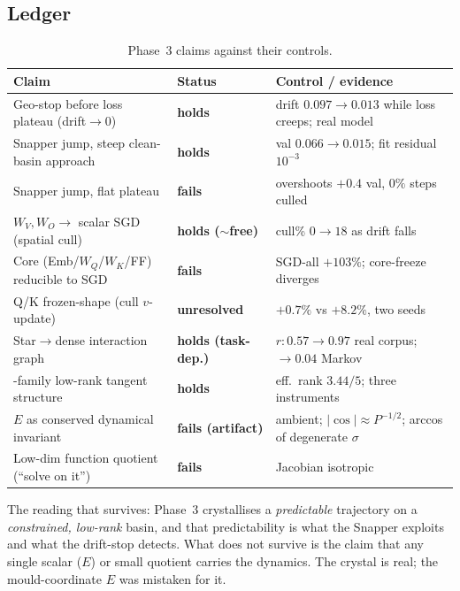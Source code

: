 \subsection{Ledger}
\begin{table}[H]
\centering
\caption{Phase~3 claims against their controls.}
\label{tab:phase3ledger}
\begin{tabular}{p{} p{} p{}}
\toprule
\textbf{Claim} & \textbf{Status} & \textbf{Control / evidence} \\
\midrule
Geo-stop before loss plateau (drift$\to$0) & \textbf{holds} & drift $0.097\!\to\!0.013$ while loss creeps; real model \\
\addlinespace
Snapper jump, steep clean-basin approach & \textbf{holds} & val $0.066\!\to\!0.015$; fit residual $10^{-3}$ \\
\addlinespace
Snapper jump, flat plateau & \textbf{fails} & overshoots $+0.4$ val, $0\%$ steps culled \\
\addlinespace
$W_V,W_O\to$ scalar SGD (spatial cull) & \textbf{holds ($\sim$free)} & cull\% $0\!\to\!18$ as drift falls \\
\addlinespace
Core (Emb/$W_Q$/$W_K$/FF) reducible to SGD & \textbf{fails} & SGD-all $+103\%$; core-freeze diverges \\
\addlinespace
Q/K frozen-shape (cull $v$-update) & \textbf{unresolved} & $+0.7\%$ vs $+8.2\%$, two seeds \\
\addlinespace
Star$\to$dense interaction graph & \textbf{holds (task-dep.)} & $r:0.57\!\to\!0.97$ real corpus; $\to0.04$ Markov \\
\addlinespace
2-family low-rank tangent structure & \textbf{holds} & eff.\ rank $3.44/5$; three instruments \\
\addlinespace
$E$ as conserved dynamical invariant & \textbf{fails (artifact)} & ambient; $\lvert\cos\rvert\!\approx\!P^{-1/2}$; arccos of degenerate $\sigma$ \\
\addlinespace
Low-dim function quotient (``solve on it'') & \textbf{fails} & Jacobian isotropic \\
\bottomrule
\end{tabular}
\end{table}

\noindent
The reading that survives: Phase~3 crystallises a \emph{predictable} trajectory
on a \emph{constrained, low-rank} basin, and that predictability is what the
Snapper exploits and what the drift-stop detects. What does not survive is the
claim that any single scalar ($E$) or small quotient carries the dynamics. The
crystal is real; the mould-coordinate $E$ was mistaken for it.
